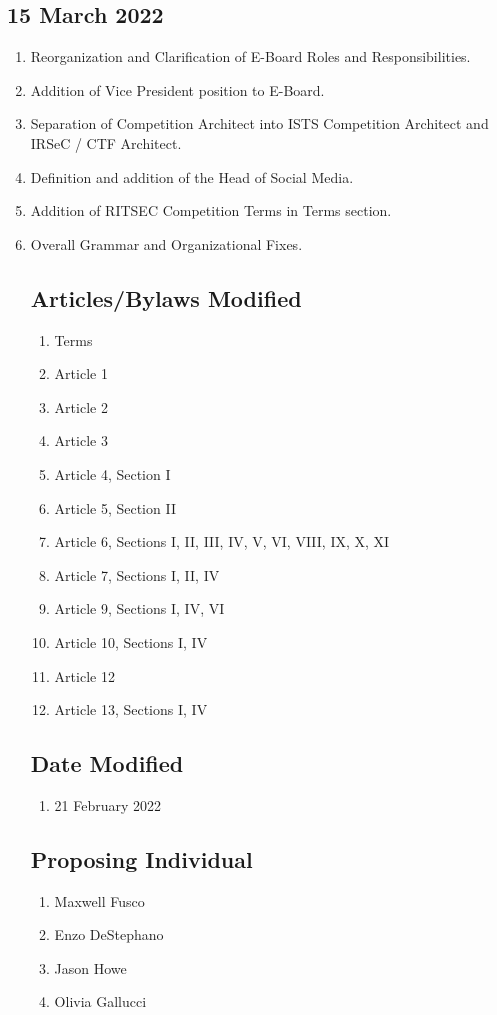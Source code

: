   \subsection{15 March 2022}
    \begin{enumerate}
      \item Reorganization and Clarification of E-Board Roles and Responsibilities. 
      \item Addition of Vice President position to E-Board. 
      \item Separation of Competition Architect into ISTS Competition Architect and IRSeC / CTF Architect.
      \item Definition and addition of the Head of Social Media.
      \item Addition of RITSEC Competition Terms in Terms section.
      \item Overall Grammar and Organizational Fixes.
  
        \subsection{Articles/Bylaws Modified}
        \begin{enumerate}
          \item Terms
          \item Article 1
          \item Article 2
          \item Article 3
          \item Article 4, Section I
          \item Article 5, Section II
          \item Article 6, Sections I, II, III, IV, V, VI, VIII, IX, X, XI
          \item Article 7, Sections I, II, IV
          \item Article 9, Sections I, IV, VI
          \item Article 10, Sections I, IV
          \item Article 12
          \item Article 13, Sections I, IV
        \end{enumerate} 
  
        \subsection{Date Modified}
        \begin{enumerate}
          \item 21 February 2022
        \end{enumerate}
  
        \subsection{Proposing Individual}
        \begin{enumerate}
          \item Maxwell Fusco
          \item Enzo DeStephano
          \item Jason Howe
          \item Olivia Gallucci
        \end{enumerate}
    \end{enumerate}
    

